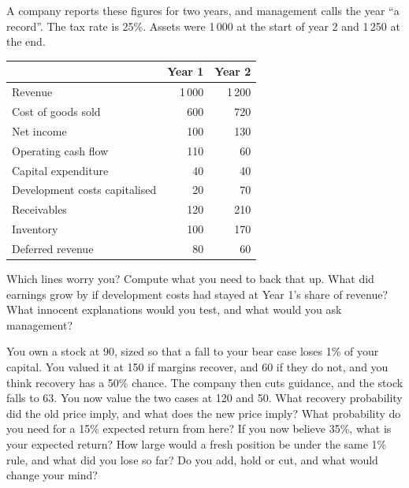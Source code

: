 \begin{question}\label{iq:iv2:valuation-and-financial-statements:24}
A company reports these figures for two years, and management calls the year ``a record''. The tax rate is 25\%. Assets were 1\,000 at the start of year 2 and 1\,250 at the end.
\begin{center}\small
\begin{tabular}{@{}lrr@{}}
 & Year 1 & Year 2 \\ \hline
Revenue & 1\,000 & 1\,200 \\
Cost of goods sold & 600 & 720 \\
Net income & 100 & 130 \\
Operating cash flow & 110 & 60 \\
Capital expenditure & 40 & 40 \\
Development costs capitalised & 20 & 70 \\
Receivables & 120 & 210 \\
Inventory & 100 & 170 \\
Deferred revenue & 80 & 60
\end{tabular}
\end{center}
Which lines worry you? Compute what you need to back that up. What did earnings grow by if development costs had stayed at Year 1's share of revenue? What innocent explanations would you test, and what would you ask management?
\end{question}

\begin{question}\label{iq:iv2:valuation-and-financial-statements:25}
You own a stock at 90, sized so that a fall to your bear case loses 1\% of your capital. You valued it at 150 if margins recover, and 60 if they do not, and you think recovery has a 50\% chance. The company then cuts guidance, and the stock falls to 63. You now value the two cases at 120 and 50. What recovery probability did the old price imply, and what does the new price imply? What probability do you need for a 15\% expected return from here? If you now believe 35\%, what is your expected return? How large would a fresh position be under the same 1\% rule, and what did you lose so far? Do you add, hold or cut, and what would change your mind?
\end{question}
